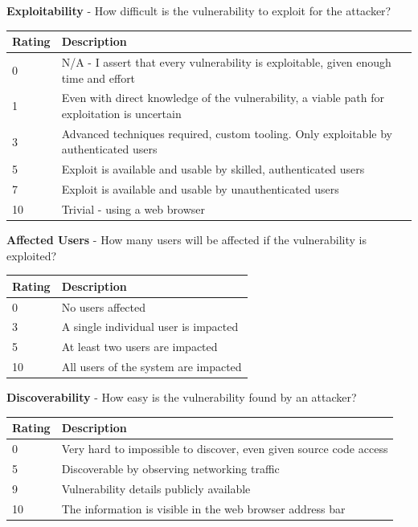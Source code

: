 \documentclass [11pt, proquest] {uwthesis}[2020/02/24]
\begin{document}
\begin{table}[H]
\label{dread:exploit}
\raggedright
\textbf{Exploitability} - How difficult is the vulnerability to exploit for the attacker?
\begin{tabular}{|m{1.5cm}|p{15cm} |}
\hline
Rating & Description \\
\hline
0 &  N/A - I assert that every vulnerability is exploitable, given enough time and effort \\
\hline
1 &   Even with direct knowledge of the vulnerability, a viable path for exploitation is uncertain  \\
\hline
3 &  Advanced techniques required, custom tooling. Only exploitable by authenticated users \\
\hline
5 &  Exploit is available and usable by skilled, authenticated users \\
\hline
7 &  Exploit is available and usable by unauthenticated users \\
\hline
10 & Trivial - using a web browser  \\
\hline
\end{tabular}
\end{table}

\begin{table}[H]
\label{dread:affect}
\raggedright
\textbf{Affected Users} - How many users will be affected if the vulnerability is exploited?
\begin{tabular}{|m{1.5cm}|p{15cm} |}
\hline
Rating & Description \\
\hline
0 &   No users affected \\
\hline
3 &  A single individual user is impacted  \\
\hline
5 &  At least two users are impacted \\
\hline
10 &  All users of the system are impacted \\
\hline
\end{tabular}
\end{table}

\begin{table}[H]
\label{dread:discover}
\raggedright
\textbf{Discoverability} - How easy is the vulnerability found by an attacker?
\begin{tabular}{|m{1.5cm}|p{15cm} |}
\hline
Rating & Description \\
\hline
0 &   Very hard to impossible to discover, even given source code access \\
\hline
5 &  Discoverable by observing networking traffic  \\
\hline
9 &   Vulnerability details publicly available \\
\hline
10 &  The information is visible in the web browser address bar \\
\hline
\end{tabular}
\end{table}
\end{document}
